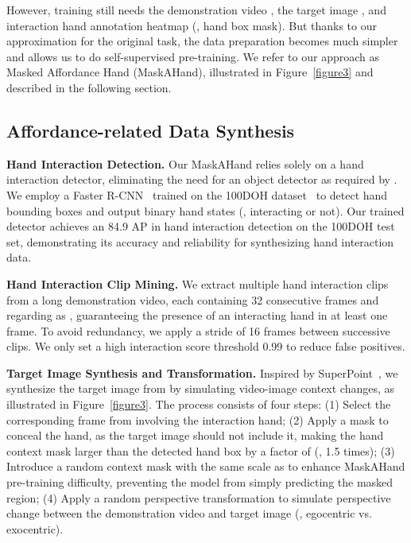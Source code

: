 \documentclass[10pt,twocolumn,letterpaper]{article}
\begin{document}
{However, training  still needs the demonstration video , the target image , and interaction hand annotation heatmap  (\eg, hand box mask). But thanks to our approximation for the original task, the data preparation becomes much simpler and allows us to do self-supervised pre-training. We refer to our approach as Masked Affordance Hand (MaskAHand), illustrated in Figure~\ref{figure3} and described in the following section.

\subsection{Affordance-related Data Synthesis}

\noindent\textbf{Hand Interaction Detection.} 
Our MaskAHand relies solely on a hand interaction detector, eliminating the need for an object detector as required by \cite{jointhand,probes}. We employ a Faster R-CNN~\cite{faster_rcnn,fpn} trained on the 100DOH dataset~\cite{100doh,epic-kitchens-55,charades-ego,egtea} to detect hand bounding boxes and output binary hand states (\ie, interacting or not). Our trained detector achieves an 84.9 AP in hand interaction detection on the 100DOH test set, demonstrating its accuracy and reliability for synthesizing hand interaction data.

\noindent\textbf{Hand Interaction Clip Mining.}
We extract multiple hand interaction clips from a long demonstration video, each containing 32 consecutive frames and regarding as , guaranteeing the presence of an interacting hand in at least one frame. To avoid redundancy, we apply a stride of 16 frames between successive clips. We only set a high interaction score threshold 0.99 to reduce false positives.

\noindent\textbf{Target Image Synthesis and Transformation.} 
Inspired by SuperPoint~\cite{superpoint}, we synthesize the target image  from  by simulating video-image context changes, as illustrated in Figure~\ref{figure3}. The process consists of four steps: (1) Select the corresponding frame from  involving the interaction hand; (2) Apply a mask to conceal the hand, as the target image should not include it, making the hand context mask  larger than the detected hand box by a factor of  (\eg, 1.5 times); (3) Introduce a random context mask  with the same scale as  to enhance MaskAHand pre-training difficulty, preventing the model from simply predicting the masked region; (4) Apply a random perspective transformation to simulate perspective change between the demonstration video and target image (\eg, egocentric vs. exocentric). 

}
\end{document}
